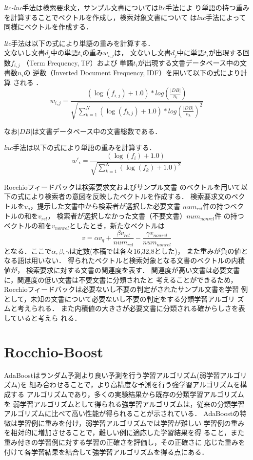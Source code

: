 {\it ltc-lnc}手法は検索要求文，サンプル文書については{\it ltc}手法によ
り単語の持つ重みを計算することでベクトルを作成し，検索対象文書について
は{\it lnc}手法によって同様にベクトルを作成する．

{\it ltc}手法は以下の式により単語の重みを計算する．\\
文ないし文書$d_{j}$中の単語$t_{i}$の重み$w_{i,j}$は，
文ないし文書$d_{j}$中に単語$t_{i}$が出現する回数$f_{i,j}$
（Term Frequency,$\:$TF）および
単語$t_{i}$が出現する文書データベース中の文書数$n_{i}$の
逆数（Inverted Document Frequency,$\;$IDF）を用いて以下の式により計算
される
\cite{bib:Buckley}．
\[
w_{i,j}=\frac{(\log(f_{i,j})+1.0)*log(\frac{|DB|}{n_{i}})}
{\sqrt{\sum_{k=1}^{N}{(\log(f_{k,j})+1.0)*log(\frac{|DB|}{n_{k}})}^2}}
\label{eqn:tf-idf}
\]

なお$|DB|$は文書データベース中の文書総数である．

{\it lnc}手法は以下の式により単語の重みを計算する．
\[
w'_{i}=\frac{(\log(f_{i})+1.0)}
{\sqrt{\sum_{k=1}^{N}{(\log(f_{k})+1.0)}^2}}
\]

Rocchioフィードバック\cite{bib:Rocchio}は検索要求文およびサンプル文書
のベクトルを用いて以下の式により検索者の意図を反映したベクトルを作成する．
検索要求文のベクトルを$v_q$，提示した文書中から検索者が選択した必要文書
$num_{rel}$件の持つベクトルの和を$v_{rel}$，
検索者が選択しなかった文書（不要文書）$num_{nonrel}$件
の持つベクトルの和を$v_{nonrel}$としたとき，新たなベクトルは
\[
v = \alpha v_{q} + \frac{\beta v_{rel}}{num_{rel}} - \frac{\gamma v_{nonrel}}{num_{nonrel}}
\]
となる．ここで$\alpha, \beta, \gamma$は定数(本稿では各々16,32,8とした)，
また重みが負の値となる語は用いない．
得られたベクトルと検索対象となる文書のベクトルの内積値が，
検索要求に対する文書の関連度を表す．
関連度が高い文書は必要文書に，関連度の低い文書は不要文書に分類されたと
考えることができるため，
Rocchioフィードバックは必要ないし不要の判定がされたサンプル文書を学習
例として，未知の文書について必要ないし不要の判定をする分類学習アルゴリ
ズムと考えられる．
また内積値の大きさが必要文書に分類される確からしさを表していると考えら
れる．

\section{Rocchio-Boost}
AdaBoostはランダム予測より良い予測を行う学習アルゴリズム(弱学習アルゴリズム)を
組み合わせることで，より高精度な予測を行う強学習アルゴリズムを構成する
アルゴリズムであり，多くの実験結果から既存の分類学習アルゴリズムを
弱学習アルゴリズムとして得られる強学習アルゴリズムは，従来の分類学習
アルゴリズムに比べて高い性能が得られることが示されている\cite{bib:Boost}．
AdaBoostの特徴は学習例に重みを付け，弱学習アルゴリズムでは学習が難しい
学習例の重みを相対的に増加させることで，難しい例に適応した学習結果を得
ること，また重み付きの学習例に対する学習の正確さを評価し，その正確さに
応じた重みを付けて各学習結果を結合して強学習アルゴリズムを得る点にある．

